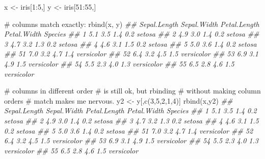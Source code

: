 \documentclass[
  13,
  letterpaper,
]{report}
\newenvironment{Shaded}{\begin{snugshade}}{\end{snugshade}}
\newcommand{\CommentTok}[1]{\textcolor[rgb]{0.37,0.37,0.37}{#1}}
\newcommand{\DecValTok}[1]{\textcolor[rgb]{0.68,0.00,0.00}{#1}}
\newcommand{\DocumentationTok}[1]{\textcolor[rgb]{0.37,0.37,0.37}{\textit{#1}}}
\newcommand{\FunctionTok}[1]{\textcolor[rgb]{0.28,0.35,0.67}{#1}}
\newcommand{\NormalTok}[1]{\textcolor[rgb]{0.00,0.23,0.31}{#1}}
\newcommand{\OtherTok}[1]{\textcolor[rgb]{0.00,0.23,0.31}{#1}}
\newcommand{\SpecialCharTok}[1]{\textcolor[rgb]{0.37,0.37,0.37}{#1}}
\begin{document}
\begin{Shaded}
\begin{Highlighting}[]

\NormalTok{x }\OtherTok{\textless{}{-}}\NormalTok{ iris[}\DecValTok{1}\SpecialCharTok{:}\DecValTok{5}\NormalTok{,]}
\NormalTok{y }\OtherTok{\textless{}{-}}\NormalTok{ iris[}\DecValTok{51}\SpecialCharTok{:}\DecValTok{55}\NormalTok{,]}

\CommentTok{\# columns match exactly:}
\FunctionTok{rbind}\NormalTok{(x, y)}
\DocumentationTok{\#\#    Sepal.Length Sepal.Width Petal.Length Petal.Width    Species}
\DocumentationTok{\#\# 1           5.1         3.5          1.4         0.2     setosa}
\DocumentationTok{\#\# 2           4.9         3.0          1.4         0.2     setosa}
\DocumentationTok{\#\# 3           4.7         3.2          1.3         0.2     setosa}
\DocumentationTok{\#\# 4           4.6         3.1          1.5         0.2     setosa}
\DocumentationTok{\#\# 5           5.0         3.6          1.4         0.2     setosa}
\DocumentationTok{\#\# 51          7.0         3.2          4.7         1.4 versicolor}
\DocumentationTok{\#\# 52          6.4         3.2          4.5         1.5 versicolor}
\DocumentationTok{\#\# 53          6.9         3.1          4.9         1.5 versicolor}
\DocumentationTok{\#\# 54          5.5         2.3          4.0         1.3 versicolor}
\DocumentationTok{\#\# 55          6.5         2.8          4.6         1.5 versicolor}

\CommentTok{\# columns in different order}
\CommentTok{\# is still ok, but rbinding}
\CommentTok{\# without making column orders}
\CommentTok{\# match makes me nervous.}
\NormalTok{y2 }\OtherTok{\textless{}{-}}\NormalTok{ y[,}\FunctionTok{c}\NormalTok{(}\DecValTok{3}\NormalTok{,}\DecValTok{5}\NormalTok{,}\DecValTok{2}\NormalTok{,}\DecValTok{1}\NormalTok{,}\DecValTok{4}\NormalTok{)]}
\FunctionTok{rbind}\NormalTok{(x,y2)}
\DocumentationTok{\#\#    Sepal.Length Sepal.Width Petal.Length Petal.Width    Species}
\DocumentationTok{\#\# 1           5.1         3.5          1.4         0.2     setosa}
\DocumentationTok{\#\# 2           4.9         3.0          1.4         0.2     setosa}
\DocumentationTok{\#\# 3           4.7         3.2          1.3         0.2     setosa}
\DocumentationTok{\#\# 4           4.6         3.1          1.5         0.2     setosa}
\DocumentationTok{\#\# 5           5.0         3.6          1.4         0.2     setosa}
\DocumentationTok{\#\# 51          7.0         3.2          4.7         1.4 versicolor}
\DocumentationTok{\#\# 52          6.4         3.2          4.5         1.5 versicolor}
\DocumentationTok{\#\# 53          6.9         3.1          4.9         1.5 versicolor}
\DocumentationTok{\#\# 54          5.5         2.3          4.0         1.3 versicolor}
\DocumentationTok{\#\# 55          6.5         2.8          4.6         1.5 versicolor}


\end{Highlighting}
\end{Shaded}
\end{document}
